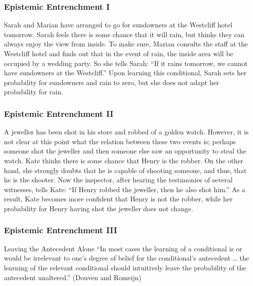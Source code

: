 \documentclass[xcolor=dvipsnames]{beamer}
\begin{document}
\begin{frame}
  \frametitle{Epistemic Entrenchment I}
  Sarah and Marian have arranged to go for sundowners at the
  Westcliff hotel tomorrow. Sarah feels there is some chance that
  it will rain, but thinks they can always enjoy the view from
  inside. To make sure, Marian consults the staff at the Westcliff
  hotel and finds out that in the event of rain, the inside area
  will be occupied by a wedding party. So she tells Sarah: ``If it
  rains tomorrow, we cannot have sundowners at the Westcliff.''
  Upon learning this conditional, Sarah sets her probability for
  sundowners and rain to zero, but she does not adapt her
  probability for rain.
\end{frame}

\begin{frame}
  \frametitle{Epistemic Entrenchment II}
  A jeweller has been shot in his store and robbed of a golden
  watch. However, it is not clear at this point what the relation
  between these two events is; perhaps someone shot the jeweller
  and then someone else saw an opportunity to steal the watch.
  Kate thinks there is some chance that Henry is the robber. On
  the other hand, she strongly doubts that he is capable of
  shooting someone, and thus, that he is the shooter. Now the
  inspector, after hearing the testimonies of several witnesses,
  tells Kate: ``If Henry robbed the jeweller, then he also shot
  him.'' As a result, Kate becomes more confident that Henry is
  not the robber, while her probability for Henry having shot the
  jeweller does not change.
\end{frame}

\begin{frame}
  \frametitle{Epistemic Entrenchment III}
  \begin{block}{Leaving the Antecedent Alone}
    ``In most cases the learning of a conditional is or would be
    irrelevant to one's degree of belief for the conditional's
    antecedent {\ldots} the learning of the relevant conditional
    should intuitively leave the probability of the antecedent
    unaltered.'' \linebreak (Douven and Romeijn)
  \end{block}
\end{frame}
\end{document}
